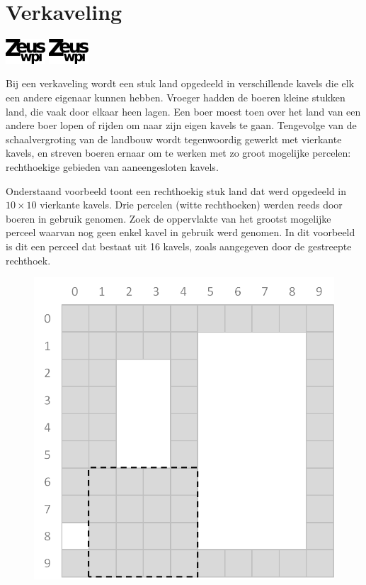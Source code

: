 
\section*{Verkaveling}
\flushright
\includegraphics[width=4em]{logo-new.png}
\includegraphics[width=4em]{logo-new.png}
\flushleft

Bij een verkaveling wordt een stuk land opgedeeld in verschillende kavels die elk een andere eigenaar kunnen hebben. Vroeger hadden de boeren kleine stukken land, die vaak door elkaar heen lagen. Een boer moest toen over het land van een andere boer lopen of rijden om naar zijn eigen kavels te gaan. Tengevolge van de schaalvergroting van de landbouw wordt tegenwoordig gewerkt met vierkante kavels, en streven boeren ernaar om te werken met zo groot mogelijke percelen: rechthoekige gebieden van aaneengesloten kavels.

Onderstaand voorbeeld toont een rechthoekig stuk land dat werd opgedeeld in $10 \times 10$ vierkante kavels. Drie percelen (witte rechthoeken) werden reeds door boeren in gebruik genomen. Zoek de oppervlakte van het grootst mogelijke perceel waarvan nog geen enkel kavel in gebruik werd genomen. In dit voorbeeld is dit een perceel dat bestaat uit 16 kavels, zoals aangegeven door de gestreepte rechthoek.

\begin{figure}[H]
  \center \includegraphics[scale=0.30]{verkaveling/verkaveling.png}
\end{figure}

